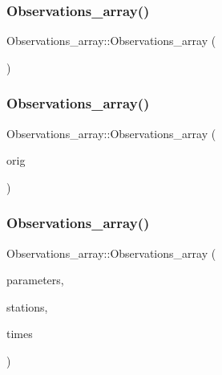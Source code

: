 \subsubsection{\texorpdfstring{Observations\+\_\+array()}{Observations\_array()}\hspace{0.1cm}{\footnotesize\ttfamily [1/4]}}
{\footnotesize\ttfamily Observations\+\_\+array\+::\+Observations\+\_\+array (\begin{DoxyParamCaption}{ }\end{DoxyParamCaption})}

\mbox{\label{class_observations__array_aa448781dd6c9c75fd3fa8ebf0e41e86d}} 
\subsubsection{\texorpdfstring{Observations\+\_\+array()}{Observations\_array()}\hspace{0.1cm}{\footnotesize\ttfamily [2/4]}}
{\footnotesize\ttfamily Observations\+\_\+array\+::\+Observations\+\_\+array (\begin{DoxyParamCaption}\item[{const \mbox{\hyperlink{class_observations__array}{Observations\+\_\+array}} \&}]{orig }\end{DoxyParamCaption})\hspace{0.3cm}{\ttfamily [delete]}}

\mbox{\label{class_observations__array_afff89d6d2bb295ae83c2dc02d2529ea3}} 
\subsubsection{\texorpdfstring{Observations\+\_\+array()}{Observations\_array()}\hspace{0.1cm}{\footnotesize\ttfamily [3/4]}}
{\footnotesize\ttfamily Observations\+\_\+array\+::\+Observations\+\_\+array (\begin{DoxyParamCaption}\item[{\mbox{\hyperlink{classanen_par_1_1_parameters}{anen\+Par\+::\+Parameters}}}]{parameters,  }\item[{\mbox{\hyperlink{classanen_sta_1_1_stations}{anen\+Sta\+::\+Stations}}}]{stations,  }\item[{\mbox{\hyperlink{classanen_time_1_1_times}{anen\+Time\+::\+Times}}}]{times }\end{DoxyParamCaption})}

